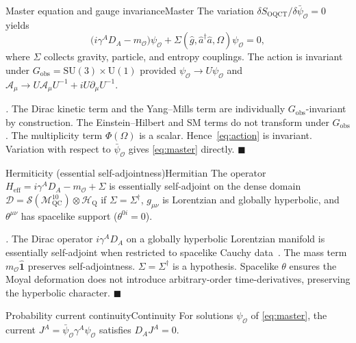 \documentclass[11pt,a4paper]{article}
\theoremstyle{myrmk}
\renewenvironment{proof}[1][\proofname]{%
  \par\noindent\textit{#1.}\enspace\ignorespaces}{\hfill$\blacksquare$\par\medskip}
\newcommand{\Mmanifold}{\mathcal{M}^{10}_{\mathrm{QC}}}
\newcommand{\HH}{\mathcal{H}_{\mathrm{Q}}}
\newcommand{\Identity}{\hat{\mathbf{1}}}
\begin{document}
\begin{theorem}{Master equation and gauge invariance}{Master}
The variation $\delta S_{\mathrm{OQCT}}/\delta\bar\psi_{\mathcal{O}}=0$ yields
\begin{equation}
  \bigl(i\gamma^A D_A-m_{\mathcal{O}}\bigr)\psi_{\mathcal{O}}
   +\Sigma(\hat g,\hat a^\dagger\hat a,\Omega)\psi_{\mathcal{O}} = 0,
  \label{eq:master}
\end{equation}
where $\Sigma$ collects gravity, particle, and entropy couplings. The action is
invariant under $G_{\mathrm{obs}}=\mathrm{SU}(3)\times\mathrm{U}(1)$ provided
$\psi_{\mathcal{O}}\to U\psi_{\mathcal{O}}$ and
$\mathcal{A}_\mu\to U\mathcal{A}_\mu U^{-1}+iU\partial_\mu U^{-1}$.
\end{theorem}

\begin{proof}
The Dirac kinetic term and the Yang--Mills term are individually
$G_{\mathrm{obs}}$-invariant by construction. The Einstein--Hilbert and SM terms do not
transform under $G_{\mathrm{obs}}$. The multiplicity term $\Phi(\Omega)$ is a scalar.
Hence~\eqref{eq:action} is invariant. Variation with respect to $\bar\psi_{\mathcal{O}}$
gives \eqref{eq:master} directly.
\end{proof}

\begin{proposition}{Hermiticity (essential self-adjointness)}{Hermitian}
The operator $H_{\mathrm{eff}}=i\gamma^A D_A-m_{\mathcal{O}}+\Sigma$ is essentially
self-adjoint on the dense domain $\mathcal{D}=\mathcal{S}(\Mmanifold)\otimes\HH$ if
$\Sigma=\Sigma^\dagger$, $g_{\mu\nu}$ is Lorentzian and globally hyperbolic, and
$\theta^{\mu\nu}$ has spacelike support ($\theta^{0i}=0$).
\end{proposition}

\begin{proof}
The Dirac operator $i\gamma^A D_A$ on a globally hyperbolic Lorentzian manifold is
essentially self-adjoint when restricted to spacelike Cauchy data~\cite{Wald1994}.
The mass term $m_{\mathcal{O}}\Identity$ preserves self-adjointness. $\Sigma=\Sigma^\dagger$
is a hypothesis. Spacelike $\theta$ ensures the Moyal deformation does not introduce
arbitrary-order time-derivatives, preserving the hyperbolic character.
\end{proof}

\begin{proposition}{Probability current continuity}{Continuity}
For solutions $\psi_{\mathcal{O}}$ of \eqref{eq:master}, the current
$J^A=\bar\psi_{\mathcal{O}}\gamma^A\psi_{\mathcal{O}}$ satisfies $D_A J^A=0$.
\end{proposition}
\end{document}
